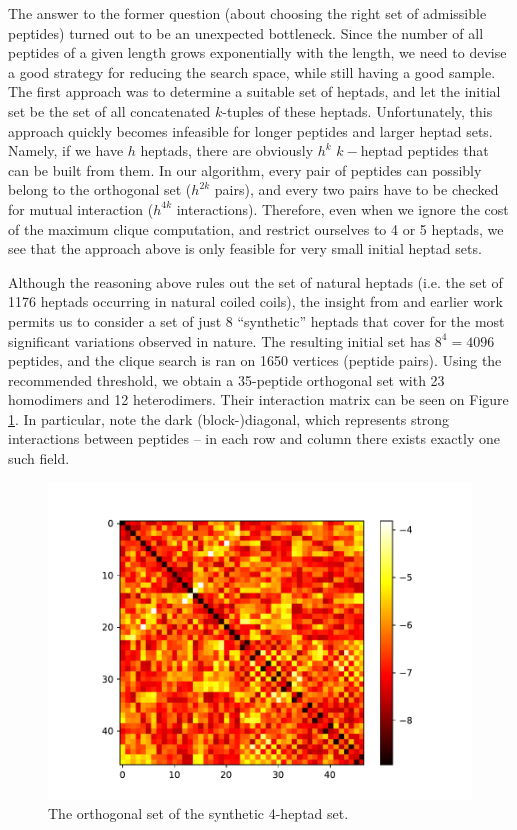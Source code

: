 \documentclass[12pt,a4paper,titlepage,openany]{report}
\begin{document}
The answer to the former question (about choosing the right set of admissible peptides) turned out to be an unexpected bottleneck. Since the number of all peptides of a given length grows exponentially with the length, we need to devise a good strategy for reducing the search space, while still having a good sample. The first approach was to determine a suitable set of heptads, and let the initial set be the set of all concatenated $k$-tuples of these heptads. Unfortunately, this approach quickly becomes infeasible for longer peptides and larger heptad sets. Namely, if we have $h$ heptads, there are obviously $h^k$ $k-$heptad peptides that can be built from them. In our algorithm, every pair of peptides can possibly belong to the orthogonal set ($h^{2k}$ pairs), and every two pairs have to be checked for mutual interaction ($h^{4k}$ interactions). Therefore, even when we ignore the cost of the maximum clique computation, and restrict ourselves to 4 or 5 heptads, we see that the approach above is only feasible for very small initial heptad sets.

Although the reasoning above rules out the set of natural heptads (i.e. the set of 1176 heptads occurring in natural coiled coils), the insight from \cite{potapov2015data} and earlier work permits us to consider a set of just 8 ``synthetic'' heptads that cover for the most significant variations observed in nature. The resulting initial set has $8^4 = 4096$ peptides, and the clique search is ran on 1650 vertices (peptide pairs). Using the recommended threshold, we obtain a 35-peptide orthogonal set with 23 homodimers and 12 heterodimers. Their interaction matrix can be seen on Figure \ref{fig:interaction matrix-full4096}. In particular, note the dark (block-)diagonal, which represents strong interactions between peptides -- in each row and column there exists exactly one such field.

\begin{figure}[h]
	\centering
	\includegraphics[width=0.7\linewidth]{interaction_matrix_full4096}
	\caption{The orthogonal set of the synthetic 4-heptad set.}
	\label{fig:interaction matrix-full4096}
\end{figure}
\end{document}
